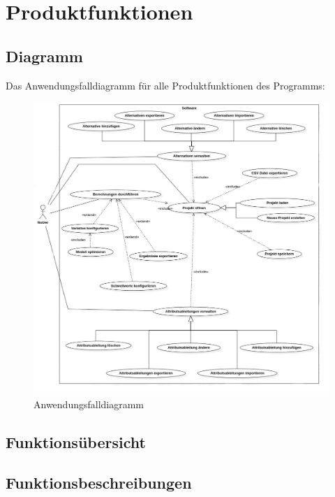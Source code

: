 \documentclass{article}
\begin{document}
\clearpage
\section{Produktfunktionen}
\subsection{Diagramm}
Das Anwendungsfalldiagramm für alle Produktfunktionen des Programms:
\begin{figure}[H]%
  \centering
  \includegraphics[width=15cm]{specifications/img/use-case/UseCaseDiagramFinal2NWM.jpg}
  \caption{Anwendungsfalldiagramm}
\end{figure} 
\newpage
\subsection{Funktionsübersicht}

\subsection{Funktionsbeschreibungen}
\end{document}
